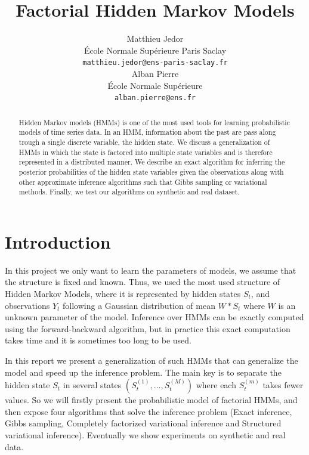 \documentclass{article}
\title{Factorial Hidden Markov Models}
\author{
  Matthieu Jedor \\
  École Normale Supérieure Paris Saclay \\
  \texttt{matthieu.jedor@ens-paris-saclay.fr} \\
   \And
   Alban Pierre \\
   École Normale Supérieure \\
   \texttt{alban.pierre@ens.fr} \\
}
\begin{document}

\maketitle

\begin{abstract}
  Hidden Markov models (HMMs) is one of the most used tools for learning probabilistic models of time series data. In an HMM, information about the past are pass along trough a single discrete variable, the hidden state. We discuss a generalization of HMMs in which the state is factored into multiple state variables and is therefore represented in a distributed manner. We describe an exact algorithm for inferring the posterior probabilities of the hidden state variables given the observations along with other approximate inference algorithms such that Gibbs sampling or variational methods. Finally, we test our algorithms on synthetic and real dataset.
\end{abstract}

\section{Introduction}

In this project we only want to learn the parameters of models, we assume that the structure is fixed and known. Thus, we used the most used structure of Hidden Markov Models, where it is represented by hidden states $S_t$, and observations $Y_t$ following a Gaussian distribution of mean $W*S_t$ where $W$ is an unknown parameter of the model. Inference over HMMs can be exactly computed using the forward-backward algorithm, but in practice this exact computation takes time and it is sometimes too long to be used.

In this report we present a generalization of such HMMs that can generalize the model and speed up the inference problem. The main key is to separate the hidden state $S_t$ in several states $(S_t^{(1)},\dots,S_t^{(M)})$ where each $S_t^{(m)}$ takes fewer values. So we will firstly present the probabilistic model of factorial HMMs, and then expose four algorithms that solve the inference problem (Exact inference, Gibbs sampling, Completely factorized variational inference and Structured variational inference). Eventually we show experiments on synthetic and real data.
\end{document}
